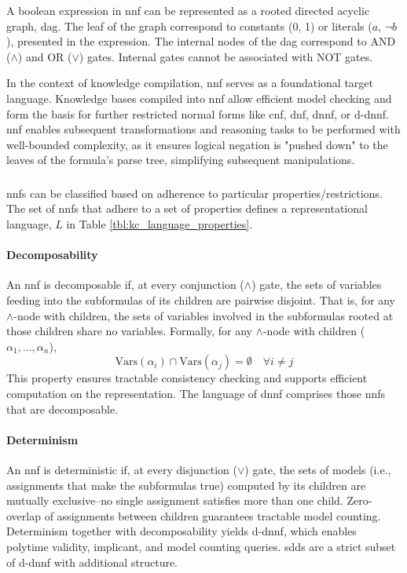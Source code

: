 A boolean expression in \acrshort{nnf} can be represented as a rooted directed acyclic graph, \acrshort{dag}. The leaf of the graph correspond to constants (0, 1) or literals ($a$, $\neg b$), presented in the expression. The internal nodes of the \acrshort{dag} correspond to AND ($\land$) and OR ($\lor$) gates. Internal gates cannot be associated with NOT gates.

In the context of knowledge compilation, \acrshort{nnf} serves as a foundational target language. Knowledge bases compiled into \acrshort{nnf} allow efficient model checking and form the basis for further restricted normal forms like \acrfull{cnf}, \acrfull{dnf}, \acrfull{dnnf}, or \acrfull{d-dnnf}. \acrshort{nnf} enables subsequent transformations and reasoning tasks to be performed with well-bounded complexity, as it ensures logical negation is "pushed down" to the leaves of the formula's parse tree, simplifying subsequent manipulations.

\subsubsection{\color{blue}{Properties of NNF}}
 \acrshort{nnf}s can be classified based on adherence to particular properties/restrictions. The set of  \acrshort{nnf}s that adhere to a set of properties defines a representational language, $L$ in Table \ref{tbl:kc_language_properties}.

\paragraph{Decomposability}
An \acrshort{nnf} is decomposable if, at every conjunction ($\land$) gate, the sets of variables feeding into the subformulas of its children are pairwise disjoint. That is, for any $\wedge$-node with children, the sets of variables involved in the subformulas rooted at those children share no variables. 
Formally, for any $\wedge$-node with children ($\alpha_1, \ldots, \alpha_n$),
\[
\mathrm{Vars}(\alpha_i) \cap \mathrm{Vars}(\alpha_j) = \emptyset \quad \forall i \neq j
\]
This property ensures tractable consistency checking and supports efficient computation on the representation. The language of \acrshort{dnnf} comprises those \acrshort{nnf}s that are decomposable.

\paragraph{Determinism}
An \acrshort{nnf} is deterministic if, at every disjunction ($\lor$) gate, the sets of models (i.e., assignments that make the subformulas true) computed by its children are mutually exclusive--no single assignment satisfies more than one child. 
Zero-overlap of assignments between children guarantees tractable model counting. Determinism together with decomposability yields \acrfull{d-dnnf}, which enables polytime validity, implicant, and model counting queries. \acrfull{sdd}s are a strict subset of \acrshort{d-dnnf} with additional structure.


